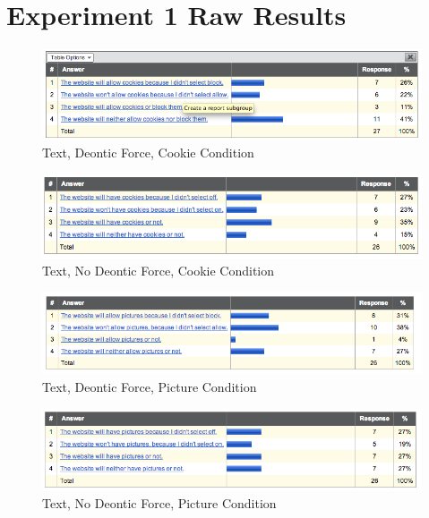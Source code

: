 
\chapter{Experiment 1 Raw Results}
\label{exp1-raw}
\begin{figure}[h!]
\centerline{
\includegraphics[scale=.44]{chapter5.tex/raw1}
}
\caption{Text, Deontic Force, Cookie Condition}
\end{figure}


\begin{figure}[h!]
\centerline{
\includegraphics[scale=.45]{chapter5.tex/raw2}
}
\caption{Text, No Deontic Force, Cookie Condition}
\end{figure}


\begin{figure}[h!]
\centerline{
\includegraphics[scale=.45]{chapter5.tex/raw3}
}
\caption{Text, Deontic Force, Picture Condition}
\end{figure}


\begin{figure}[h!]
\centerline{
\includegraphics[scale=.45]{chapter5.tex/raw4}
}
\caption{Text, No Deontic Force, Picture Condition}
\end{figure}


